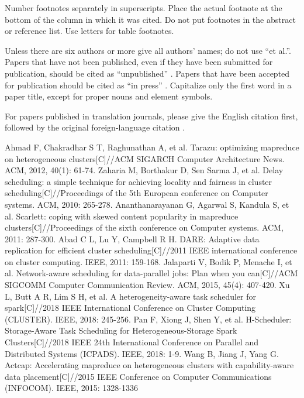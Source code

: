 \documentclass[conference]{IEEEtran}
\begin{document}
Number footnotes separately in superscripts. Place the actual footnote at 
the bottom of the column in which it was cited. Do not put footnotes in the 
abstract or reference list. Use letters for table footnotes.

Unless there are six authors or more give all authors' names; do not use 
``et al.''. Papers that have not been published, even if they have been 
submitted for publication, should be cited as ``unpublished'' \cite{b4}. Papers 
that have been accepted for publication should be cited as ``in press'' \cite{b5}. 
Capitalize only the first word in a paper title, except for proper nouns and 
element symbols.

For papers published in translation journals, please give the English 
citation first, followed by the original foreign-language citation \cite{b6}.

\begin{thebibliography}{00}
 Ahmad F, Chakradhar S T, Raghunathan A, et al. Tarazu: optimizing mapreduce on heterogeneous clusters[C]//ACM SIGARCH Computer Architecture News. ACM, 2012, 40(1): 61-74.
 Zaharia M, Borthakur D, Sen Sarma J, et al. Delay scheduling: a simple technique for achieving locality and fairness in cluster scheduling[C]//Proceedings of the 5th European conference on Computer systems. ACM, 2010: 265-278.
 Ananthanarayanan G, Agarwal S, Kandula S, et al. Scarlett: coping with skewed content popularity in mapreduce clusters[C]//Proceedings of the sixth conference on Computer systems. ACM, 2011: 287-300.
 Abad C L, Lu Y, Campbell R H. DARE: Adaptive data replication for efficient cluster scheduling[C]//2011 IEEE international conference on cluster computing. IEEE, 2011: 159-168.
 Jalaparti V, Bodik P, Menache I, et al. Network-aware scheduling for data-parallel jobs: Plan when you can[C]//ACM SIGCOMM Computer Communication Review. ACM, 2015, 45(4): 407-420.
 Xu L, Butt A R, Lim S H, et al. A heterogeneity-aware task scheduler for spark[C]//2018 IEEE International Conference on Cluster Computing (CLUSTER). IEEE, 2018: 245-256.
 Pan F, Xiong J, Shen Y, et al. H-Scheduler: Storage-Aware Task Scheduling for Heterogeneous-Storage Spark Clusters[C]//2018 IEEE 24th International Conference on Parallel and Distributed Systems (ICPADS). IEEE, 2018: 1-9.
 Wang B, Jiang J, Yang G. Actcap: Accelerating mapreduce on heterogeneous clusters with capability-aware data placement[C]//2015 IEEE Conference on Computer Communications (INFOCOM). IEEE, 2015: 1328-1336
\end{thebibliography}
\end{document}
